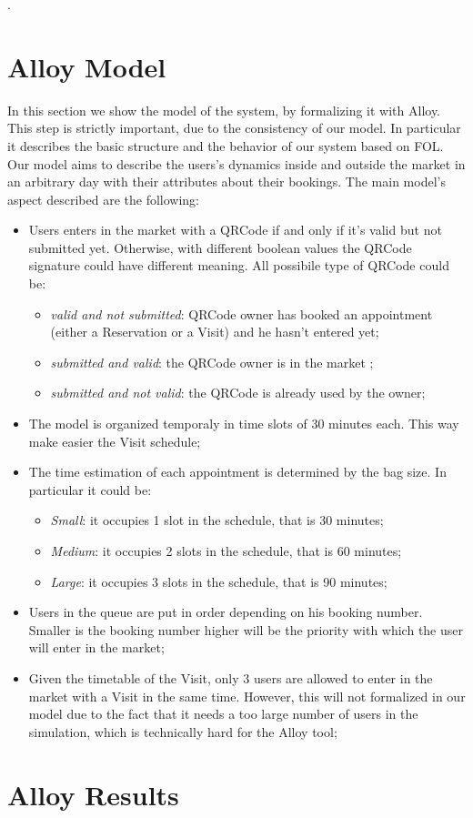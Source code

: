 \lstset{language=Alloy}.



\section{Alloy Model}
In this section we show the model of the system, by formalizing it with Alloy. This step is strictly important, due to the consistency of our model. 
In particular it describes the basic structure and the behavior of our system based on FOL.
Our model aims to describe the users's dynamics inside and outside the market in an arbitrary day with their attributes about their bookings.
The main model's aspect described are the following:

\begin{itemize}
\item Users enters in the market with a QRCode if and only if it's valid but not submitted yet. Otherwise, with different boolean values the QRCode signature could have different meaning. All possibile type of QRCode could be:
    \begin{itemize}
    \item \textit{valid and not submitted}: QRCode owner has booked an appointment (either a Reservation or a Visit) and he hasn't entered yet;
    \item \textit{submitted and valid}: the QRCode owner is in the market ;
    \item \textit{submitted and not valid}: the QRCode is already used by the owner;
    \end{itemize}
\item The model is organized temporaly in time slots of 30 minutes each. This way make easier the Visit schedule;
\item The time estimation of each appointment is determined by the bag size. In particular it could be:
\begin{itemize}
\item \textit{Small}: it occupies 1 slot in the schedule, that is 30 minutes;
\item \textit{Medium}: it occupies 2 slots in the schedule, that is 60 minutes;
\item \textit{Large}: it occupies 3 slots in the schedule, that is 90 minutes;
\end{itemize}

\item Users in the queue are put in order depending on his booking number. Smaller is  the booking number higher will be the priority with which the user will enter in the market;

\item Given the timetable of the Visit, only 3 users are allowed to enter in the market with a Visit in the same time. However, this will not formalized in our model due to the fact that it needs a too large number of users in the simulation, which is technically hard for the Alloy tool;

\end{itemize}






\section{Alloy Results}
